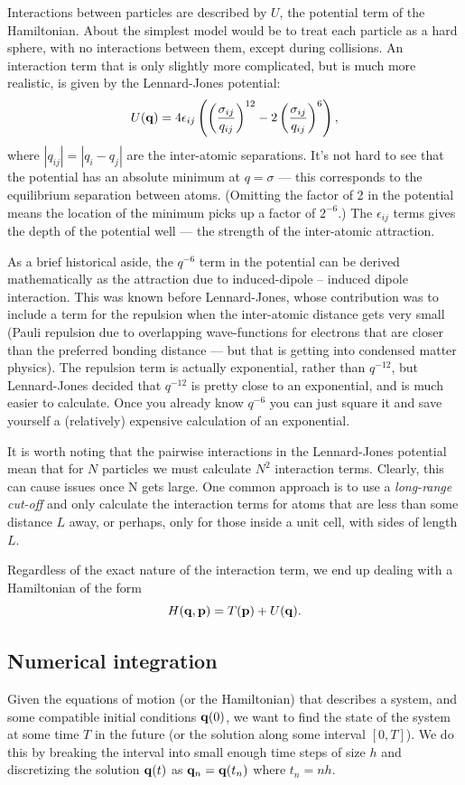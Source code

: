 Interactions between particles are described by $U$, the potential term of the Hamiltonian. About the simplest model would be to treat each particle as a hard sphere, with no interactions between them, except during collisions.
An interaction term that is only slightly more complicated, but is much more realistic, is given by the Lennard-Jones potential:
$$
	U({\bf q}) = 4\epsilon_{ij}\left(\left(\frac{\sigma_{ij}}{q_{ij}}\right)^{12} - 2\left(\frac{\sigma_{ij}}{q_{ij}}\right)^{6}\right),
$$
where $|q_{ij}| = |q_i-q_j|$ are the inter-atomic separations. It's not hard to see that the potential has an absolute minimum at $q = \sigma$ --- this corresponds to the equilibrium separation between atoms. (Omitting the factor of 2 in the potential means the location of the minimum picks up a factor of $2^{-6}$.) The $\epsilon_{ij}$ terms gives the depth of the potential well --- the strength of the inter-atomic attraction. 

As a brief historical aside, the $q^{-6}$ term in the potential can be derived mathematically as the attraction due to induced-dipole -- induced dipole interaction. This was known before Lennard-Jones, whose contribution was to include a term for the repulsion when the inter-atomic distance gets very small (Pauli repulsion due to overlapping wave-functions for electrons that are closer than the preferred bonding distance --- but that is getting into condensed matter physics). The repulsion term is actually exponential, rather than $q^{-12}$, but Lennard-Jones decided that $q^{-12}$ is pretty close to an exponential, and is much easier to calculate. Once you already know $q^{-6}$ you can just square it and save yourself a (relatively) expensive calculation of an exponential.

It is worth noting that the pairwise interactions in the Lennard-Jones potential mean that for $N$ particles we must calculate $N^2$ interaction terms. Clearly, this can cause issues once N gets large. One common approach is to use a \emph{long-range cut-off} and only calculate the interaction terms for atoms that are less than some distance $L$ away, or perhaps, only for those inside a unit cell, with sides of length $L$.

Regardless of the exact nature of the interaction term, we end up dealing with a Hamiltonian of the form 
$$
	H({\bf q},{\bf p}) = T({\bf p}) + U({\bf q}).
$$

\subsection{Numerical integration}
Given the equations of motion (or the Hamiltonian) that describes a system, and some compatible initial conditions ${\bf q}(0)$, we want to find the state of the system at some time $T$ in the future (or the solution along some interval $[0,T]$). We do this by breaking the interval into small enough time steps of size $h$ and discretizing the solution ${\bf q}(t)$ as ${\bf q}_n = {\bf q}(t_n) $ where $t_n = nh$.

